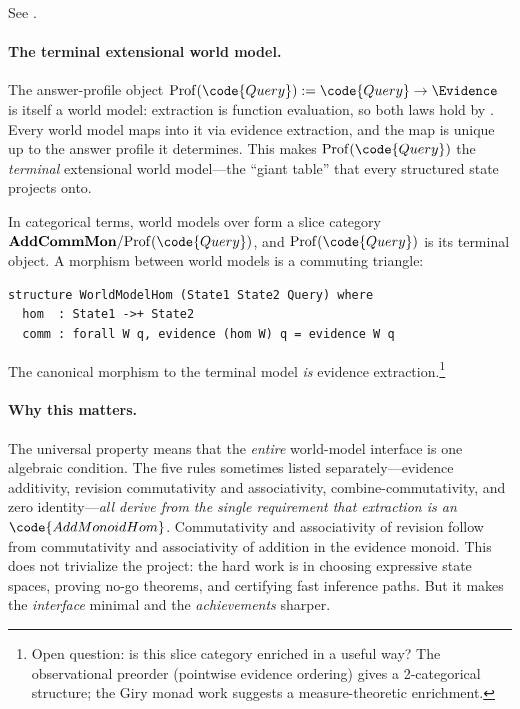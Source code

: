 \documentclass[11pt,openany]{report}
\begin{document}
\noindent
See .

\paragraph{The terminal extensional world model.}
The answer-profile object $\mathrm{Prof}(\code{Query}) :=
\code{Query} \to \Evidence$ is itself a world model: extraction is
function evaluation, so both laws hold by .  Every world
model maps into it via evidence extraction, and the map is unique
up to the answer profile it determines.  This makes
$\mathrm{Prof}(\code{Query})$ the \emph{terminal} extensional world
model---the ``giant table'' that every structured state projects
onto.

In categorical terms, world models over  form a slice
category $\mathbf{AddCommMon} / \mathrm{Prof}(\code{Query})$,
and $\mathrm{Prof}(\code{Query})$ is its terminal object.  A morphism
between world models is a commuting triangle:

\begin{lstlisting}
structure WorldModelHom (State1 State2 Query) where
  hom  : State1 ->+ State2
  comm : forall W q, evidence (hom W) q = evidence W q
\end{lstlisting}

\noindent
The canonical morphism to the terminal model \emph{is} evidence
extraction.\footnote{Open question: is this slice category enriched
in a useful way?  The observational preorder (pointwise evidence
ordering) gives a 2-categorical structure; the Giry monad work
suggests a measure-theoretic enrichment.}

\paragraph{Why this matters.}
The universal property means that the \emph{entire} world-model
interface is one algebraic condition.  The five rules sometimes listed
separately---evidence additivity, revision commutativity and
associativity, combine-commutativity, and zero
identity---\emph{all derive from the single requirement that
extraction is an $\code{AddMonoidHom}$}.  Commutativity and
associativity of revision follow from commutativity and associativity
of addition in the evidence monoid.  This does not trivialize the
project: the hard work is in choosing expressive state spaces, proving
no-go theorems, and certifying fast inference paths.  But it makes the
\emph{interface} minimal and the \emph{achievements} sharper.
\end{document}
